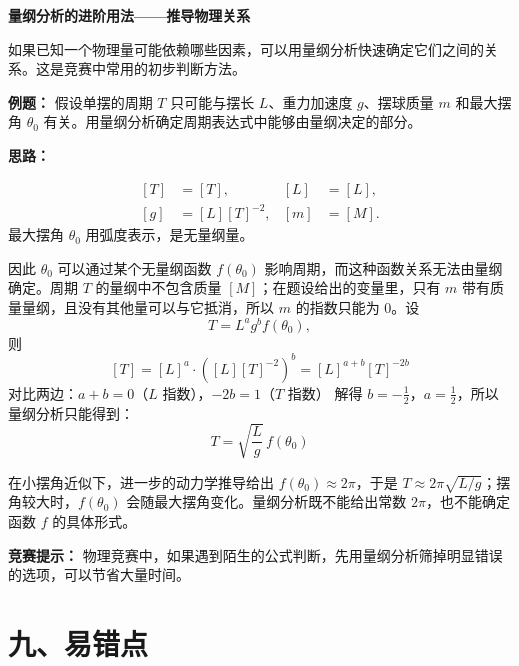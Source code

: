 \begin{competitionbox}
\textbf{量纲分析的进阶用法——推导物理关系}

如果已知一个物理量可能依赖哪些因素，可以用量纲分析快速确定它们之间的关系。这是竞赛中常用的初步判断方法。

\textbf{例题：} 假设单摆的周期 $T$ 只可能与摆长 $L$、重力加速度 $g$、摆球质量 $m$ 和最大摆角 $\theta_0$ 有关。用量纲分析确定周期表达式中能够由量纲决定的部分。

\textbf{思路：}
\begin{center}
\begin{minipage}[c]{0.42\linewidth}
\centering

\end{minipage}\hfill
\begin{minipage}[c]{0.50\linewidth}
\[
\begin{aligned}
[T]&=[T], & [L]&=[L],\\
[g]&=[L][T]^{-2}, & [m]&=[M].
\end{aligned}
\]
最大摆角 $\theta_0$ 用弧度表示，是无量纲量。
\end{minipage}

\label{fig:day01-dimensional-pendulum}
\end{center}

因此 $\theta_0$ 可以通过某个无量纲函数 $f(\theta_0)$ 影响周期，而这种函数关系无法由量纲确定。周期 $T$ 的量纲中不包含质量 $[M]$；在题设给出的变量里，只有 $m$ 带有质量量纲，且没有其他量可以与它抵消，所以 $m$ 的指数只能为 $0$。设
\[
T=L^a g^b f(\theta_0),
\]
则
\[
[T] = [L]^a \cdot ([L][T]^{-2})^b = [L]^{a+b}[T]^{-2b}
\]
对比两边：$a + b = 0$（$L$ 指数），$-2b = 1$（$T$ 指数）
解得 $b = -\frac12$，$a = \frac12$，所以量纲分析只能得到：
\[
T=\sqrt{\frac{L}{g}}\,f(\theta_0)
\]

在小摆角近似下，进一步的动力学推导给出
$f(\theta_0)\approx2\pi$，于是
$T\approx2\pi\sqrt{L/g}$；摆角较大时，$f(\theta_0)$ 会随最大摆角变化。量纲分析既不能给出常数 $2\pi$，也不能确定函数 $f$ 的具体形式。

\textbf{竞赛提示：} 物理竞赛中，如果遇到陌生的公式判断，先用量纲分析筛掉明显错误的选项，可以节省大量时间。
\end{competitionbox}

\vfill
\pagebreak
\section*{九、易错点}

